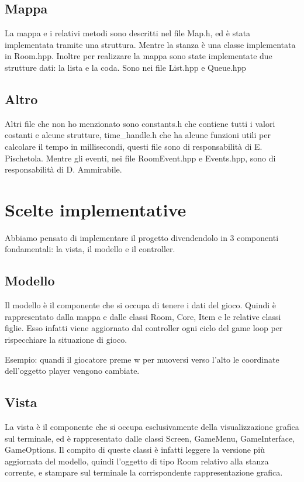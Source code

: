 \documentclass{article}
\begin{document}
\subsection{Mappa}
La mappa e i relativi metodi sono descritti nel file Map.h, ed è stata implementata tramite una struttura. Mentre la stanza è una classe implementata in Room.hpp. Inoltre per realizzare la mappa sono state implementate due strutture dati: la lista e la coda. Sono nei file List.hpp e Queue.hpp

\subsection{Altro}
Altri file che non ho menzionato sono constants.h che contiene tutti i valori costanti e alcune strutture, time\_handle.h che ha alcune funzioni utili per calcolare il tempo in millisecondi, questi file sono di responsabilità di E. Pischetola. Mentre gli eventi, nei file RoomEvent.hpp e Events.hpp, sono di responsabilità di D. Ammirabile.

\section{Scelte implementative}
Abbiamo pensato di implementare il progetto divendendolo in 3 componenti fondamentali: la vista, il modello e il controller.
\subsection{Modello}
Il modello è il componente che si occupa di tenere i dati del gioco. Quindi è rappresentato dalla mappa e dalle classi Room, Core, Item e le relative classi figlie.
Esso infatti viene aggiornato dal controller ogni ciclo del game loop per rispecchiare la situazione di gioco.

Esempio: quandi il giocatore preme w per muoversi verso l'alto le coordinate dell'oggetto player vengono cambiate.
\subsection{Vista}
La vista è il componente che si occupa esclusivamente della visualizzazione grafica sul terminale, ed è rappresentato dalle classi Screen, GameMenu, GameInterface, GameOptions. 
Il compito di queste classi è infatti leggere la versione più aggiornata del modello, quindi l'oggetto di tipo Room relativo alla stanza corrente, e stampare sul terminale la corrispondente rappresentazione grafica.
\end{document}
